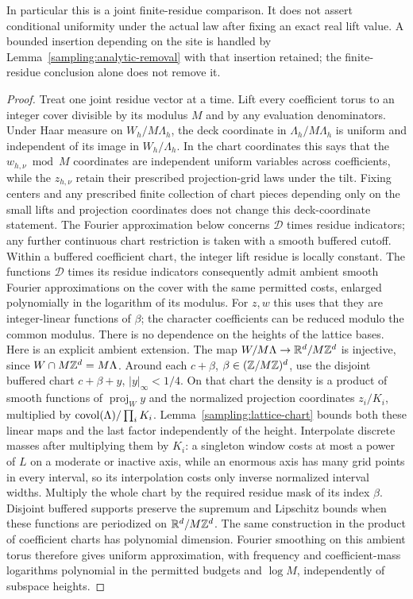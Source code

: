 In particular this is a joint finite-residue comparison.  It does not
assert conditional uniformity under the actual law after fixing an exact
real lift value.  A bounded insertion depending on the site is handled
by Lemma~\ref{sampling:analytic-removal} with that insertion retained;
the finite-residue conclusion alone does not remove it.

\begin{proof}
Treat one joint residue vector at a time.  Lift every coefficient torus
to an integer cover divisible by its modulus $M$ and by any evaluation
denominators.  Under Haar measure
on $W_h/M\Lambda_h$, the deck coordinate in $\Lambda_h/M\Lambda_h$
is uniform and independent of its image in $W_h/\Lambda_h$.  In the chart
coordinates this says that the $w_{h,\nu}\bmod M$ coordinates are
independent uniform variables across coefficients, while the $z_{h,\nu}$
retain their prescribed projection-grid laws under the tilt.  Fixing centers
and any prescribed finite collection of chart pieces depending only on
the small lifts and projection coordinates does not change this
deck-coordinate statement.  The Fourier approximation below concerns
$\mathcal D$ times residue indicators; any further continuous chart
restriction is taken with a smooth buffered cutoff.  Within a buffered
coefficient chart, the integer lift residue is locally constant.
The functions $\mathcal D$ times its residue indicators consequently
admit ambient smooth Fourier approximations on the cover with the same
permitted costs, enlarged polynomially in the logarithm of its modulus.
For $z,w$ this uses that they are integer-linear functions of $\beta$;
the character coefficients can be reduced modulo the common modulus.
There is no dependence on the heights of the lattice bases.  Here is an
explicit ambient extension.  The map $W/M\Lambda\to\mathbb R^d/M\mathbb Z^d$ is
injective, since $W\cap M\mathbb Z^d=M\Lambda$.  Around each
$c+\beta$, $\beta\in(\mathbb Z/M\mathbb Z)^d$, use the disjoint buffered chart
$c+\beta+y$, $|y|_\infty<1/4$.  On that chart the density is a product
of smooth functions of $\operatorname{proj}_Wy$ and the normalized
projection coordinates $z_i/K_i$, multiplied by
$\operatorname{covol}(\Lambda)/\prod_iK_i$.  Lemma~\ref{sampling:lattice-chart}
bounds both these linear maps and the last factor independently of the
height.  Interpolate discrete masses after multiplying them by $K_i$: a
singleton window costs at most a power of $L$ on a moderate or inactive
axis, while an enormous axis has many grid points in every interval, so
its interpolation costs only inverse normalized interval widths.  Multiply
the whole chart by the required residue mask of its index $\beta$.
Disjoint buffered supports preserve the supremum and Lipschitz bounds
when these functions are periodized on $\mathbb R^d/M\mathbb Z^d$.  The same
construction in the product of coefficient charts has polynomial
dimension.  Fourier smoothing on this ambient torus therefore gives
uniform approximation, with frequency and coefficient-mass logarithms
polynomial in the permitted budgets and $\log M$, independently of
subspace heights.


\end{proof}
